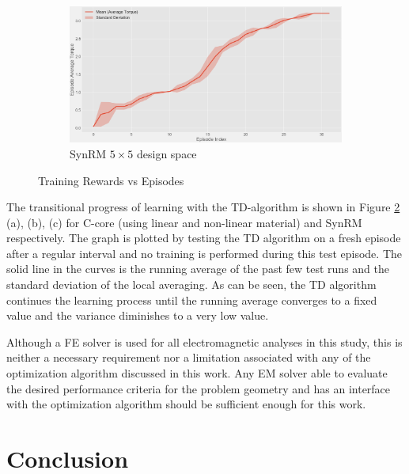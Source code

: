 \begin{figure}[h!]
\begin{subfigure}{0.65\textwidth}
        \includegraphics[width=\linewidth]{Figures/Ch_MDP/SynRM_training.png}
        \caption{SynRM $5 \times 5$ design space}
        \label{fig:synRM_training_rewards}  
    \end{subfigure}
    \caption{Training Rewards vs Episodes}
    \label{fig:MDP_raining_results}
\end{figure}

The transitional progress of learning with the TD-algorithm is shown in Figure \ref{fig:MDP_raining_results} (a), (b), (c) for C-core (using linear and non-linear material) and SynRM respectively. The graph is plotted by testing the TD algorithm on a fresh episode after a regular interval and no training is performed during this test episode. The solid line in the curves is the running average of the past few test runs and the standard deviation of the local averaging. As can be seen, the TD algorithm continues the learning process until the running average converges to a fixed value and the variance diminishes to a very low value.

Although a FE solver \parencite{Magnet} is used for all electromagnetic analyses in this study, this is neither a necessary requirement nor a limitation associated with any of the optimization algorithm discussed in this work. Any EM solver able to evaluate the desired performance criteria for the problem geometry and has an interface with the optimization algorithm should be sufficient enough for this work.

\section{Conclusion}

